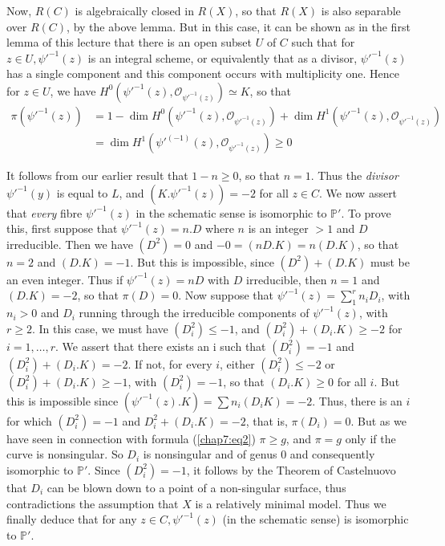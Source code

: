 Now, $R(C)$ is algebraically closed in $R(X)$, so that $R(X)$ is also
separable over $R(C)$, by the above lemma. But in this case, it can be
shown as in the first lemma of this lecture that there is an open
subset $U$ of $C$ such that for $z \in U, \psi'^{-1}(z)$ is an
integral scheme, or equivalently that as a divisor, $\psi'^{-1}(z)$
has a single component and this component occurs with multiplicity
one. Hence for $z \in U$, we have
$H^0(\psi'^{-1}(z),\mathscr{O}_{\psi'^{ -1} (z)})\simeq K$, so that    
\begin{align*}
  \pi(\psi'^{-1}(z))& =1-\dim H^{0}(\psi'^{-1}(z),
  \mathscr{O}_{\psi'^{-1}(z)})+\dim
  H^{1}(\psi'^{-1}(z),\mathscr{O}_{\psi'^{-1}(z)})\\
  & =\dim  H^{1}(\psi'^{(-1)}(z),\mathscr{O}_{\psi'^{-1}(z)})\geq 0 
\end{align*}

It follows from our earlier result that $1-n \ge 0$, so that
$n=1$. Thus the \textit{divisor} $\psi'^{-1} (y)$ is equal to $L$, and
$(K. \psi'^{-1}(z)) = - 2$ for all $z \in C$. We now assert that
\textit{every} fibre $\psi'^{-1}(z)$ in the schematic sense is
isomorphic to $\mathbb{P}'$. To prove this, first suppose that
$\psi'^{-1}(z)=n.D$ where $n$ is an integer $> 1$ and $D$
irreducible. Then we have $(D^2)=0$ and $-0=(n D.K) = n (D.K)$, so
that $n=2$ and $(D.K)=-1$. But this is impossible, since $(D^2) +
(D.K)$ must be an even integer. Thus if $\psi'^{-1} (z) = nD$ with $D$
irreducible, then $n=1$ and $(D.K)=-2$, so that $\pi (D)=0$. Now
suppose that $\psi'^{-1} (z) = \sum\limits^r_1 n_i D_i$,\pageoriginale
with $n_i > 0$ and $D_i$ running through the irreducible components of
$\psi'^{-1}(z)$, with $r \ge 2$. In this case, we must have $(D_i^2)
\le -1$, and $(D_i^2) + (D_i.K) \ge -2$ for $i=1,\ldots , r$. We
assert that there exists an i such that $(D_i^2) = -1 $ and $(D_i^2) +
(D_i. K) = -2$. If not, for every $i$, either $(D_i^2) \le - 2 $ or
$(D_i^2) + (D_i.K) \ge - 1$, with $(D_i^2) = - 1$, so that $(D_i . K) \ge
0$ for all $i$. But this is impossible since $(\psi'^{-1} (z). K) =
\sum n_i (D_i K) = - 2$. Thus, there is an $i$ for which $(D_i^2) = -
1$ and $D_i^2 + (D_i.K) = -2$, that is, $\pi (D_i) = 0$. But as we
have seen in connection with formula (\ref{chap7:eq2}) $\pi \ge g$, and $\pi = g$
only if the curve is nonsingular. So $D_i$ is nonsingular and of
genus $0$ and consequently isomorphic to $\mathbb{P}'$. Since
$(D_i^2) = -1$, it follows by the Theorem of Castelnuovo that $D_i$
can be blown down to a point of a non-singular surface, thus
contradictions the assumption that $X$ is a relatively minimal
model. Thus we finally deduce that for any $z \in C, \psi'^{-1} (z)$
(in the schematic sense) is isomorphic to $\mathbb{P}'$. 

